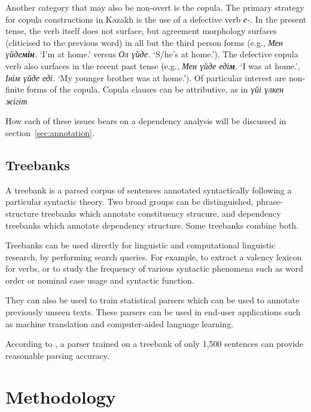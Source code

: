 \documentclass[a4paper,11pt, onecolumn,twoside]{article}
\newcommand{\kazakh}[1]{{\em #1}}
\newcommand{\gloss}[1]{`#1'}
\begin{document}
Another category that may also be non-overt is the copula.  The primary strategy for copula constructions in Kazakh is the use of a defective verb \kazakh{е-}.  In the present tense, the verb itself does not surface, but agreement morphology surfaces (cliticised to the previous word) in all but the third person forms (e.g., \kazakh{Мен үйде\textbf{мін}.} \gloss{I'm at home.} versus \kazakh{Ол үйде.} \gloss{S/he's at home.}).  The defective copula verb also surfaces in the recent past tense (e.g., \kazakh{Мен үйде еді\textbf{м}.} \gloss{I was at home.}, \kazakh{Інім үйде еді.} \gloss{My younger brother was at home.}).  Of particular interest are non-finite forms of the copula.  Copula clauses can be attributive, as in \kazakh{үйі үлкен жігіт}


How each of these issues bears on a dependency analysis will be discussed in section~\ref{sec:annotation}.


\subsection{Treebanks} %

A treebank is a parsed corpus of sentences annotated syntactically following a particular
syntactic theory. Two broad groups can be distinguished, phrase-structure treebanks
which annotate constituency strucure, and dependency treebanks which annotate dependency
structure. Some treebanks combine both.

Treebanks can be used directly for linguistic and computational linguistic research, by
performing search queries. For example, to extract a valency lexicon for verbs, or to
study the frequency of various syntactic phenomena such as word order or nominal case usage
and syntactic function.

They can also be used to train statistical parsers which can
be used to annotate previously unseen texts. These parsers can be used in end-user applications
such as machine translation and computer-aided language learning.

According to \textcite{nivre08}, a parser trained on a treebank of only 1,500 sentences 
can provide reasonable parsing accuracy.


\section{Methodology}\label{sec:method}
\end{document}
